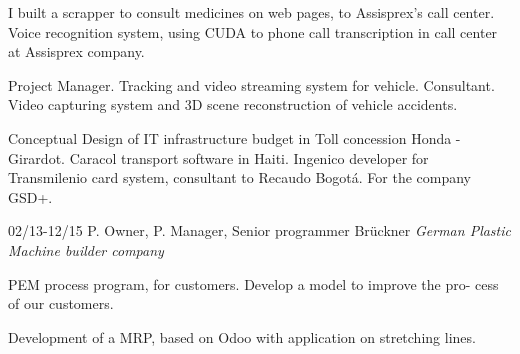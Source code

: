 \begin{entrylist}
{I built a scrapper to consult medicines on web pages, to Assisprex’s call center.
Voice recognition system, using CUDA to phone call transcription in call center at Assisprex company.

Project Manager. Tracking and video streaming system for vehicle.
Consultant. Video capturing system and 3D scene reconstruction of vehicle
accidents.

Conceptual Design of IT infrastructure budget in Toll concession Honda - Girardot. Caracol transport software in Haiti.
Ingenico developer for Transmilenio card system, consultant to Recaudo Bogotá. For the company GSD+.}

  \entry
	{02/13-12/15}
	{P. Owner, P. Manager, Senior programmer}
	{Brückner {\sl German Plastic Machine builder company}}
	{PEM process program, for customers. Develop a model to improve the pro-
cess of our customers.

	Development of a MRP, based on Odoo with application on stretching lines.}
\end{entrylist}

\newpage

